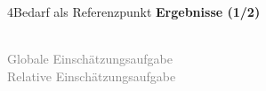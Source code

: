 \documentclass[xcolor=table,9pt,aspectratio=169]{beamer}
\begin{document}
\begin{frame}{\vspace*{10mm}4\hspace*{1em}Bedarf als Referenzpunkt}
\textbf{Ergebnisse (1/2)}\\
\begin{multicols}{2}
   \begin{center}
      \\
      \textcolor{gray}{Globale Einschätzungsaufgabe}
      \\
      \textcolor{gray}{Relative Einschätzungsaufgabe}
   \end{center}

\end{multicols}
\end{frame}
\end{document}
